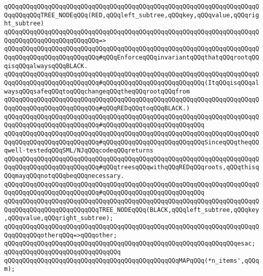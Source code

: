 \verb|qQQqqQQqqQQqqQQqqQQqqQQqqQQqqQQqqQQqqQQqqQQqqQQqqQQqqQQqqQQqqQQqqQQqqQQqqQQqqQQqTREE_NODEqQQq(RED,qQQqleft_subtree,qQQqkey,qQQqvalue,qQQqright_subtree)|\newline
\verb|qQQqqQQqqQQqqQQqqQQqqQQqqQQqqQQqqQQqqQQqqQQqqQQqqQQqqQQqqQQqqQQqqQQqqQQqqQQqqQQqqQQqqQQqqQQqqQQq=>|\newline
\verb|qQQqqQQqqQQqqQQqqQQqqQQqqQQqqQQqqQQqqQQqqQQqqQQqqQQqqQQqqQQqqQQqqQQqqQQqqQQqqQQqqQQqqQQqqQQqqQQq#qQQqEnforceqQQqinvariantqQQqthatqQQqrootqQQqisqQQqalwaysqQQqBLACK.|\newline
\verb|qQQqqQQqqQQqqQQqqQQqqQQqqQQqqQQqqQQqqQQqqQQqqQQqqQQqqQQqqQQqqQQqqQQqqQQqqQQqqQQqqQQqqQQqqQQqqQQq#qQQqqQQqqQQqqQQqqQQqqQQqqQQq(ItqQQqisqQQqalwaysqQQqsafeqQQqtoqQQqchangeqQQqtheqQQqrootqQQqfrom|\newline
\verb|qQQqqQQqqQQqqQQqqQQqqQQqqQQqqQQqqQQqqQQqqQQqqQQqqQQqqQQqqQQqqQQqqQQqqQQqqQQqqQQqqQQqqQQqqQQqqQQq#qQQqREDqQQqtoqQQqBLACK.)|\newline
\verb|qQQqqQQqqQQqqQQqqQQqqQQqqQQqqQQqqQQqqQQqqQQqqQQqqQQqqQQqqQQqqQQqqQQqqQQqqQQqqQQqqQQqqQQqqQQqqQQq#qQQqqQQqqQQqqQQqqQQqqQQqqQQq|\newline
\verb|qQQqqQQqqQQqqQQqqQQqqQQqqQQqqQQqqQQqqQQqqQQqqQQqqQQqqQQqqQQqqQQqqQQqqQQqqQQqqQQqqQQqqQQqqQQqqQQq#qQQqqQQqqQQqqQQqqQQqqQQqqQQqSinceqQQqtheqQQqwell-testedqQQqSML/NJqQQqcodeqQQqreturns|\newline
\verb|qQQqqQQqqQQqqQQqqQQqqQQqqQQqqQQqqQQqqQQqqQQqqQQqqQQqqQQqqQQqqQQqqQQqqQQqqQQqqQQqqQQqqQQqqQQqqQQq#qQQqtreesqQQqwithqQQqREDqQQqroots,qQQqthisqQQqmayqQQqnotqQQqbeqQQqnecessary.|\newline
\verb|qQQqqQQqqQQqqQQqqQQqqQQqqQQqqQQqqQQqqQQqqQQqqQQqqQQqqQQqqQQqqQQqqQQqqQQqqQQqqQQqqQQqqQQqqQQqqQQq#qQQqqQQqqQQqqQQqqQQqqQQqqQQq|\newline
\verb|qQQqqQQqqQQqqQQqqQQqqQQqqQQqqQQqqQQqqQQqqQQqqQQqqQQqqQQqqQQqqQQqqQQqqQQqqQQqqQQqqQQqqQQqqQQqqQQqTREE_NODEqQQq(BLACK,qQQqleft_subtree,qQQqkey,qQQqvalue,qQQqright_subtree);|\newline
\newline
\verb|qQQqqQQqqQQqqQQqqQQqqQQqqQQqqQQqqQQqqQQqqQQqqQQqqQQqqQQqqQQqqQQqqQQqqQQqqQQqqQQqotherqQQq=>qQQqother;|\newline
\verb|qQQqqQQqqQQqqQQqqQQqqQQqqQQqqQQqqQQqqQQqqQQqqQQqqQQqqQQqqQQqqQQqesac;|\newline
\verb|qQQqqQQqqQQqqQQqqQQqqQQqqQQqqQQq|\newline
\verb|qQQqqQQqqQQqqQQqqQQqqQQqqQQqqQQqqQQqqQQqqQQqqQQqMAPqQQq(*n_items',qQQqm);|\newline
